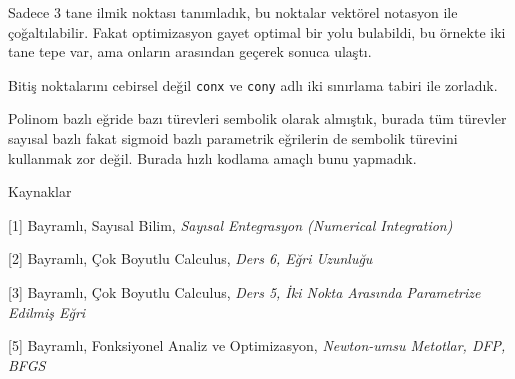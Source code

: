 \documentclass[12pt,fleqn]{article}\usepackage{../../common}
\begin{document}
Sadece 3 tane ilmik noktası tanımladık, bu noktalar vektörel notasyon ile
çoğaltılabilir. Fakat optimizasyon gayet optimal bir yolu bulabildi, bu
örnekte iki tane tepe var, ama onların arasından geçerek sonuca ulaştı. 

Bitiş noktalarını cebirsel değil \verb!conx! ve \verb!cony! adlı iki
sınırlama tabiri ile zorladık.

Polinom bazlı eğride bazı türevleri sembolik olarak almıştık, burada
tüm türevler sayısal bazlı fakat sigmoid bazlı parametrik eğrilerin de
sembolik türevini kullanmak zor değil. Burada hızlı kodlama amaçlı bunu
yapmadık. 

Kaynaklar 

[1] Bayramlı, Sayısal Bilim, {\em Sayısal Entegrasyon (Numerical Integration)}

[2] Bayramlı, Çok Boyutlu Calculus, {\em Ders 6, Eğri Uzunluğu}

[3] Bayramlı, Çok Boyutlu Calculus, {\em Ders 5, İki Nokta Arasında Parametrize Edilmiş Eğri}

[5] Bayramlı, Fonksiyonel Analiz ve Optimizasyon, {\em Newton-umsu Metotlar, DFP, BFGS }
\end{document}
